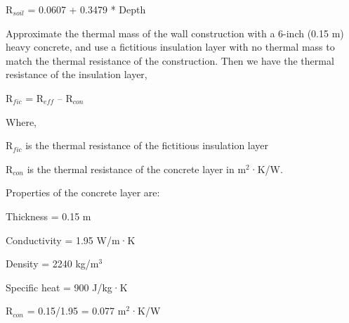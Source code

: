 R\(_{soil}\) = 0.0607 + 0.3479 * Depth

Approximate the thermal mass of the wall construction with a 6-inch (0.15 m) heavy concrete, and use a fictitious insulation layer with no thermal mass to match the thermal resistance of the construction. Then we have the thermal resistance of the insulation layer,

R\(_{fic}\) = R\(_{eff}\) -- R\(_{con}\)

Where,

R\(_{fic}\) is the thermal resistance of the fictitious insulation layer

R\(_{con}\) is the thermal resistance of the concrete layer in m\(^{2}\)·K/W.

Properties of the concrete layer are:

Thickness = 0.15 m

Conductivity = 1.95 W/m·K

Density = 2240 kg/m\(^{3}\)

Specific heat = 900 J/kg·K

R\(_{con}\) = 0.15/1.95 = 0.077 m\(^{2}\)·K/W
